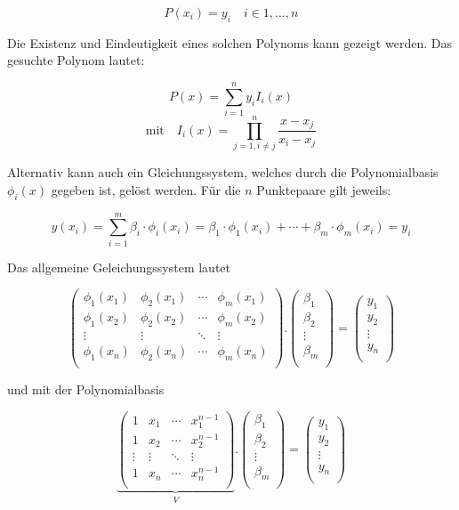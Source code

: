 \documentclass[
  letterpaper,
  DIV=11,
  numbers=noendperiod]{scrreprt}
\begin{document}
\[  P(x_i) = y_i \quad i \in 1, \dots, n \]

Die Existenz und Eindeutigkeit eines solchen Polynoms kann gezeigt
werden. Das gesuchte Polynom lautet:

\[  P(x) = \sum_{i=1}^n y_i I_i(x) \]
\[  \text{mit}\quad I_i(x) = \prod_{j=1, i\neq j}^n \frac{x-x_j}{x_i - x_j} \]

Alternativ kann auch ein Gleichungssystem, welches durch die
Polynomialbasis \(\phi_i(x)\) gegeben ist, gelöst werden. Für die \(n\)
Punktepaare gilt jeweils:

\[  y(x_i) = \sum_{i=1}^{m}\beta_i \cdot \phi_i(x_i) = \beta_1\cdot \phi_1(x_i) + \cdots + \beta_m\cdot \phi_m(x_i) = y_i \]

Das allgemeine Geleichungssystem lautet

\[  \left( \begin{matrix} \phi_1(x_1) & \phi_2(x_1) & \cdots & \phi_m(x_1) \\ 
             \phi_1(x_2) & \phi_2(x_2) & \cdots & \phi_m(x_2) \\ 
             \vdots &\vdots & \ddots & \vdots \\ 
             \phi_1(x_n) & \phi_2(x_n) & \cdots & \phi_m(x_n) \\ 
             \end{matrix}\right). 
\left(  \begin{matrix} \beta_1 \\  
      \beta_2 \\   \vdots \\   \beta_m \\ 
      \end{matrix} \right) 
= \left(  \begin{matrix} y_1 \\  y_2 \\   \vdots \\   y_n \\ \end{matrix} \right) \]

und mit der Polynomialbasis

\[ \underbrace{\left( \begin{matrix} 1 & x_1 & \cdots & x_1^{n-1} \\ 1 & x_2 & \cdots & x_2^{n-1} \\ \vdots &\vdots & \ddots & \vdots \\ 1 & x_n & \cdots & x_n^{n-1} \\ \end{matrix}\right)}_{V}. \left(  \begin{matrix} \beta_1 \\  \beta_2 \\   \vdots \\   \beta_m \\ \end{matrix} \right) = \left(  \begin{matrix} y_1 \\  y_2 \\   \vdots \\   y_n \\ \end{matrix} \right)\]
\end{document}
